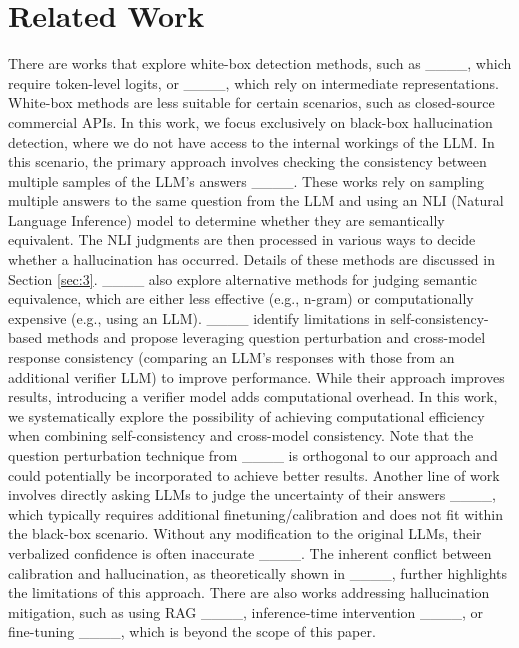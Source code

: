 \section{Related Work}
There are works that explore white-box detection methods, such as ____, which require token-level logits, or ____, which rely on intermediate representations. White-box methods are less suitable for certain scenarios, such as closed-source commercial APIs. In this work, we focus exclusively on black-box hallucination detection, where we do not have access to the internal workings of the LLM. In this scenario, the primary approach involves checking the consistency between multiple samples of the LLM's answers ____. These works rely on sampling multiple answers to the same question from the LLM and using an NLI (Natural Language Inference) model to determine whether they are semantically equivalent. The NLI judgments are then processed in various ways to decide whether a hallucination has occurred. Details of these methods are discussed in Section \ref{sec:3}. ____ also explore alternative methods for judging semantic equivalence, which are either less effective (e.g., n-gram) or computationally expensive (e.g., using an LLM). ____ identify limitations in self-consistency-based methods and propose leveraging question perturbation and cross-model response consistency (comparing an LLM's responses with those from an additional verifier LLM) to improve performance. While their approach improves results, introducing a verifier model adds computational overhead. In this work, we systematically explore the possibility of achieving computational efficiency when combining self-consistency and cross-model consistency. Note that the question perturbation technique from ____ is orthogonal to our approach and could potentially be incorporated to achieve better results. Another line of work involves directly asking LLMs to judge the uncertainty of their answers ____, which typically requires additional finetuning/calibration and does not fit within the black-box scenario. Without any modification to the original LLMs, their verbalized confidence is often inaccurate ____. The inherent conflict between calibration and hallucination, as theoretically shown in ____, further highlights the limitations of this approach. There are also works addressing hallucination mitigation, such as using RAG ____, inference-time intervention ____, or fine-tuning ____, which is beyond the scope of this paper.